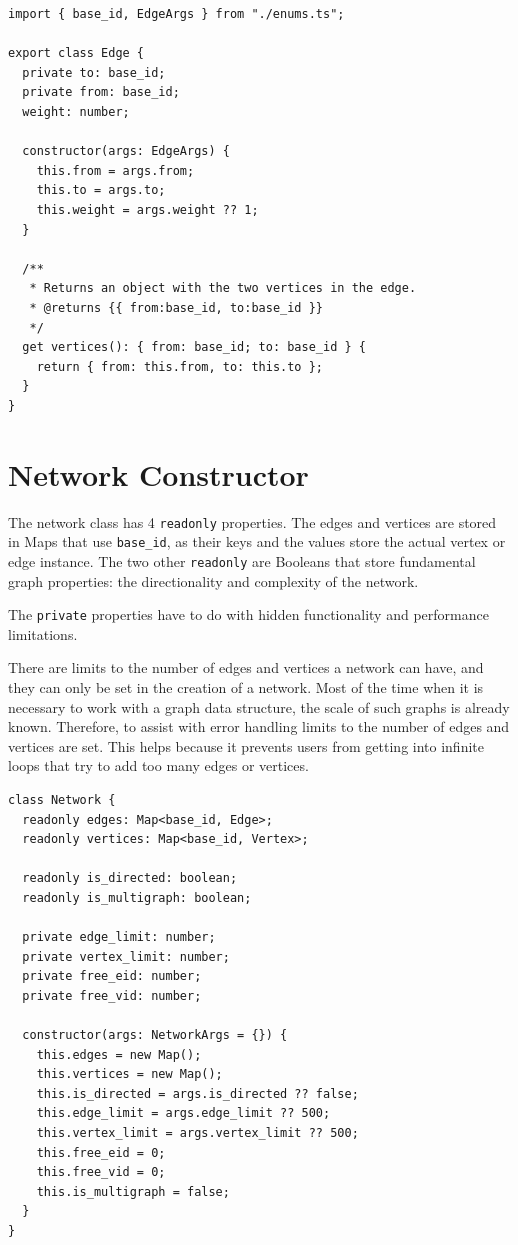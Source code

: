 \begin{verbatim}
import { base_id, EdgeArgs } from "./enums.ts";

export class Edge {
  private to: base_id;
  private from: base_id;
  weight: number;

  constructor(args: EdgeArgs) {
    this.from = args.from;
    this.to = args.to;
    this.weight = args.weight ?? 1;
  }

  /**
   * Returns an object with the two vertices in the edge.
   * @returns {{ from:base_id, to:base_id }}
   */
  get vertices(): { from: base_id; to: base_id } {
    return { from: this.from, to: this.to };
  }
}
\end{verbatim}

\section{Network Constructor}

The network class has 4 \texttt{readonly} properties.
The edges and vertices are stored in Maps that use \texttt{base_id},
as their keys and the values store the actual vertex or edge instance.
The two other \texttt{readonly} are Booleans that store fundamental graph properties:
the directionality and complexity of the network.

The \texttt{private} properties have to do with hidden functionality
and performance limitations.

There are limits to the number of edges and vertices a network can have,
and they can only be set in the creation of a network.
Most of the time when it is necessary to work with a graph data structure,
the scale of such graphs is already known.
Therefore, to assist with error handling limits to the number of edges and vertices are set.
This helps because it prevents users from getting into infinite loops that try to add
too many edges or vertices.

\begin{verbatim}
class Network {
  readonly edges: Map<base_id, Edge>;
  readonly vertices: Map<base_id, Vertex>;

  readonly is_directed: boolean;
  readonly is_multigraph: boolean;

  private edge_limit: number;
  private vertex_limit: number;
  private free_eid: number;
  private free_vid: number;

  constructor(args: NetworkArgs = {}) {
    this.edges = new Map();
    this.vertices = new Map();
    this.is_directed = args.is_directed ?? false;
    this.edge_limit = args.edge_limit ?? 500;
    this.vertex_limit = args.vertex_limit ?? 500;
    this.free_eid = 0;
    this.free_vid = 0;
    this.is_multigraph = false;
  }
}
\end{verbatim}


